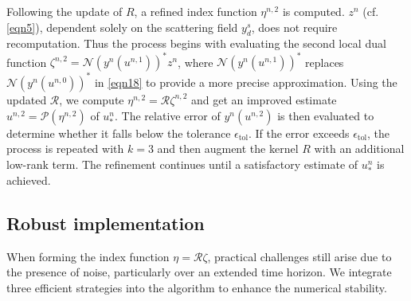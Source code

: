 \documentclass[onefignum,onetabnum]{siamart190516}
\numberwithin{equation}{section}
\begin{document}
Following the update of $R$, a refined index function $\eta^{n,2}$ is computed.
$z^{n}$ (cf. \eqref{eqn5}), dependent solely on the scattering field $y^{s}_{d}$, does not require recomputation.
Thus the process begins with evaluating the second local dual function $\zeta^{n,2} = \mathcal{N}(y^{n}(u^{n,1}))^{*} z^{n}$, where $\mathcal{N}(y^{n}(u^{n,1}))^{*}$ replaces $\mathcal{N}(y^{n}(u^{n,0}))^{*}$ in \eqref{eqn18} to provide a more precise approximation.
Using the updated $\mathcal{R}$, we compute $\eta^{n,2} = \mathcal{R} \zeta^{n,2}$ and get an improved estimate $u^{n,2}=\mathcal{P}(\eta^{n,2})$ of  $u_{*}^{n}$.
The relative error of $y^{n}(u^{n,2})$ is then evaluated to determine whether it falls below the tolerance $\epsilon_{\text{tol}}$.
If the error exceeds $\epsilon_{\text{tol}}$, the process is repeated with $k=3$ and then augment the kernel $R$ with an additional low-rank term.
The refinement continues until a satisfactory estimate of $u_{*}^{n}$ is achieved.

\subsection{Robust implementation}\label{subsec:srs}
When forming the index function $\eta = \mathcal{R}\zeta$, practical challenges still arise due to the presence of noise, particularly over an extended time horizon.
We integrate three efficient strategies into the algorithm to enhance the numerical stability.
\end{document}
